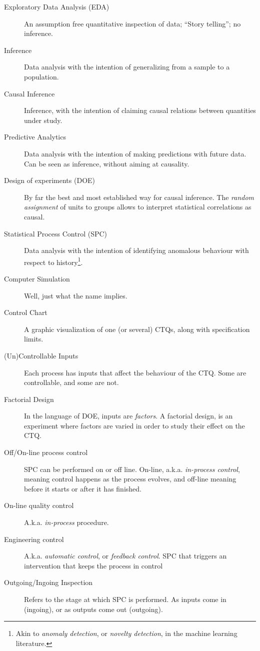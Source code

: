 \begin{description}
\item [Exploratory Data Analysis (EDA)] An assumption free quantitative inspection of data; ``Story telling''; no inference.
\item [Inference] Data analysis with the intention of generalizing from a sample to a population.
\item [Causal Inference] Inference, with the intention of claiming causal relations between quantities under study.
\item [Predictive Analytics] Data analysis with the intention of making predictions with future data. Can be seen as inference, without aiming at causality.
\item [Design of experiments (DOE)]  By far the best and most established way for causal inference. The \emph{random assignment} of units to groups allows to interpret statistical correlations as causal.
\item [Statistical Process Control (SPC)] Data analysis with the intention of identifying anomalous behaviour with respect to history\footnote{Akin to \emph{anomaly detection}, or \emph{novelty detection}, in the machine learning literature.}. 
\item [Computer Simulation] Well, just what the name implies. 
\item [Control Chart] A graphic visualization of one (or several) CTQs, along with specification limits. 
\item [(Un)Controllable Inputs] Each process has inputs that affect the behaviour of the CTQ. Some are controllable, and some are not.
\item [Factorial Design] In the language of DOE, inputs are \emph{factors}. A factorial design, is an experiment where factors are varied in order to study their effect on the CTQ.
\item [Off/On-line process control] SPC can be performed on or off line. 
On-line, a.k.a. \emph{in-process control},  meaning control happens as the process evolves, and off-line meaning before it starts or after it has finished.
\item [On-line quality control] A.k.a. \emph{in-process} procedure. 
\item [Engineering control] A.k.a. \emph{automatic control}, or \emph{feedback control}. SPC that triggers an intervention that keeps the process in control
\item [Outgoing/Ingoing Inspection] Refers to the stage at which SPC is performed. As inputs come in (ingoing), or as outputs come out (outgoing). 
\end{description}




